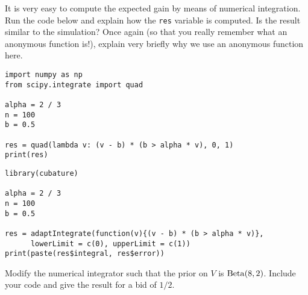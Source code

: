 \begin{exercise}
It is very easy to compute the expected gain by means of numerical integration. Run the code below and explain how the \verb|res| variable is computed.  Is the result similar to the simulation? Once again (so that you really remember what an anonymous function is!), explain very briefly why we use an anonymous function here.
\begin{verbatim}
import numpy as np
from scipy.integrate import quad

alpha = 2 / 3
n = 100
b = 0.5

res = quad(lambda v: (v - b) * (b > alpha * v), 0, 1)
print(res)
\end{verbatim}

\begin{verbatim}
library(cubature)

alpha = 2 / 3
n = 100
b = 0.5

res = adaptIntegrate(function(v){(v - b) * (b > alpha * v)},
      lowerLimit = c(0), upperLimit = c(1))
print(paste(res$integral, res$error))
\end{verbatim}
\end{exercise}

\begin{exercise}
Modify the numerical integrator  such that the prior on $V$ is $\mathrm{Beta}(8, 2)$. Include your code and give the result for a bid of $1/2$.
\end{exercise}
